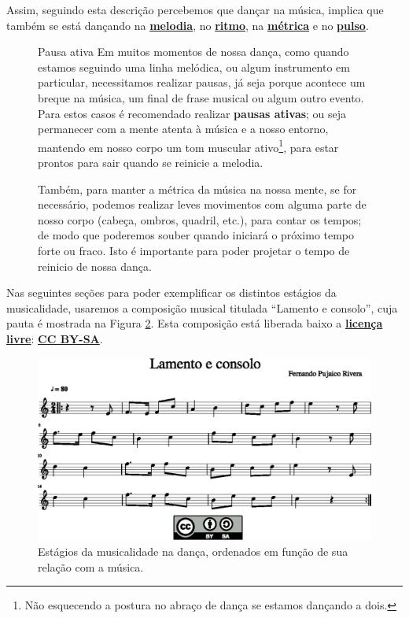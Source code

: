 Assim, seguindo esta descrição percebemos que dançar na música, 
implica que também se está dançando na \hyperref[sec:pos:Melodia]{\textbf{melodia}}, 
no \hyperref[sec:pos:Ritmo]{\textbf{ritmo}}, 
na \hyperref[def:Metrica]{\textbf{métrica}} e 
no \hyperref[ref:Pulso]{\textbf{pulso}}.

\begin{figure}[!bh]
\begin{elaboracion}{Pausa ativa}
\label{ref:pausaativa}
Em muitos momentos de nossa dança, como quando estamos seguindo uma linha melódica,
ou algum instrumento em particular, necessitamos realizar pausas, 
já seja porque acontece um breque na música, um final de frase musical ou algum outro evento.
Para estos casos é recomendado realizar \textbf{pausas ativas}; ou seja 
permanecer com a mente atenta à música e a nosso entorno, 
mantendo em nosso corpo um tom muscular ativo\footnote{Não 
esquecendo a postura no abraço de dança se estamos dançando a dois. }, 
para estar prontos para sair quando se reinicie a melodia.

Também, para manter a métrica da música na nossa mente,
se for necessário, 
podemos realizar leves movimentos com alguma parte de nosso corpo (cabeça, ombros, quadril, etc.),
para contar os tempos;  
de modo que poderemos souber quando iniciará o próximo tempo forte ou fraco.
Isto é importante para poder projetar o tempo de reinicio de nossa dança.
\end{elaboracion}
\end{figure}

Nas seguintes seções para poder exemplificar os distintos estágios da musicalidade,
usaremos a composição musical titulada ``Lamento e consolo'',
cuja pauta é mostrada na Figura \ref{fig:lamento-e-consolo}.
Esta composição está liberada baixo a 
\hyperref[ref:licensalivre]{\textbf{licença livre}}:
\hyperref[subsec:CCBYSA]{\textbf{CC BY-SA}}.


\begin{figure}
    \centering
    \includegraphics[width=\textwidth]{chapters/cap-musicalidade-tecnica/lamento-e-consolo-1.eps}
    \caption{Estágios da musicalidade na dança, ordenados em função de sua relação com a música.}
    \label{fig:lamento-e-consolo}
\end{figure}






